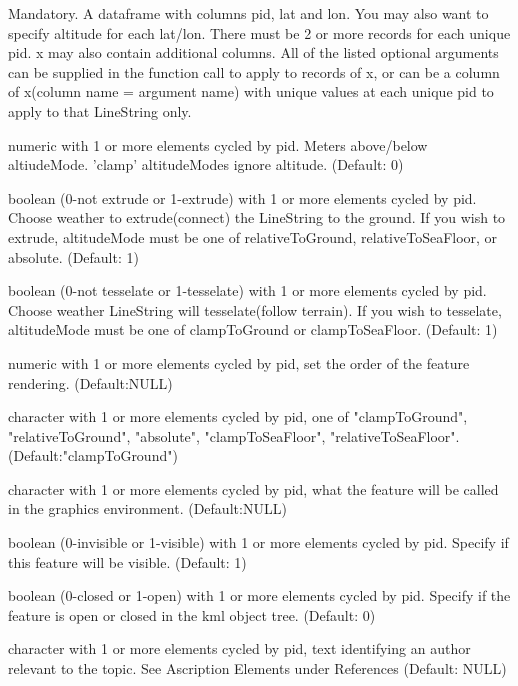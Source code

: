 \documentclass[a4paper]{book}
\begin{document}
\begin{Arguments}
\begin{ldescription}

\item[\code{x}]  Mandatory. A dataframe with columns pid, lat and lon. You may also want to specify altitude for each lat/lon. There must be 2 or more records for each unique pid. x may also contain additional columns. All of the listed optional arguments can be supplied in the function call to apply to records of x, or can be a column of x(column name = argument name) with unique values at each unique pid to apply to that LineString only.  

\item[\code{altitude}] numeric with 1 or more elements cycled by pid. Meters above/below altiudeMode. 'clamp' altitudeModes ignore altitude. (Default: 0)
\item[\code{extrude}] boolean (0-not extrude or 1-extrude) with 1 or more elements cycled by pid. Choose weather to extrude(connect) the LineString to the ground. If you wish to extrude, altitudeMode must be one of relativeToGround, relativeToSeaFloor, or absolute. (Default: 1)
\item[\code{tessellate}] boolean (0-not tesselate or 1-tesselate) with 1 or more elements cycled by pid. Choose weather LineString will tesselate(follow terrain). If you wish to tesselate, altitudeMode must be one of clampToGround or clampToSeaFloor. (Default: 1)
\item[\code{drawOrder}]  numeric with 1 or more elements cycled by pid, set the order of the feature rendering. (Default:NULL) 
\item[\code{altitudeMode}] character with 1 or more elements cycled by pid, one of "clampToGround", "relativeToGround", "absolute", "clampToSeaFloor", "relativeToSeaFloor". (Default:"clampToGround")
\item[\code{name}] character with 1 or more elements cycled by pid, what the feature will be called in the graphics environment. (Default:NULL) 
\item[\code{visibility}] boolean (0-invisible or 1-visible) with 1 or more elements cycled by pid. Specify if this feature will be visible. (Default: 1)
\item[\code{open}]  boolean (0-closed or 1-open) with 1 or more elements cycled by pid. Specify if the feature is open or closed in the kml object tree. (Default: 0)
\item[\code{atomauthor}]  character with 1 or more elements cycled by pid, text identifying an author relevant to the topic. See Ascription Elements under References (Default: NULL) 

\end{ldescription}
\end{Arguments}
\end{document}
